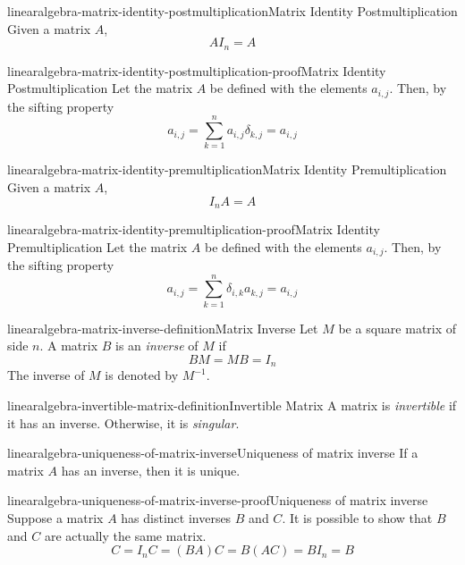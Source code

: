 \documentclass[preview]{standalone}
\begin{document}
\begin{snippetproposition}{linearalgebra-matrix-identity-postmultiplication}{Matrix Identity Postmultiplication}{
    Given a matrix \(A\),
    \[ AI_n=A \]
}
\end{snippetproposition}

\begin{snippetproof}{linearalgebra-matrix-identity-postmultiplication-proof}{Matrix Identity Postmultiplication}{
    Let the matrix \(A\) be defined with the
    elements \(a_{i,j}\).
    Then, by the sifting property %
    \[
        a_{i,j} = \sum_{k=1}^n
        a_{i,j}\delta_{k,j} = a_{i,j}
    \]
}
\end{snippetproof}

\begin{snippetproposition}{linearalgebra-matrix-identity-premultiplication}{Matrix Identity Premultiplication}{
    Given a matrix \(A\),
    \[ I_n A=A \]
}
\end{snippetproposition}

\begin{snippetproof}{linearalgebra-matrix-identity-premultiplication-proof}{Matrix Identity Premultiplication}{
    Let the matrix \(A\) be defined with the
    elements \(a_{i,j}\).
    Then, by the sifting property %
    \[
        a_{i,j} = \sum_{k=1}^n
        \delta_{i,k}a_{k,j} = a_{i,j}
    \]
}
\end{snippetproof}

\begin{snippetdefinition}{linearalgebra-matrix-inverse-definition}{Matrix Inverse}{
    Let \(M\) be a square matrix of side \(n\).
    A matrix \(B\) is an \textit{inverse}
    of \(M\) if \[BM=MB=I_n\]
    The inverse of \(M\) is denoted by \(M^{-1}\).
}
\end{snippetdefinition}

\begin{snippetdefinition}{linearalgebra-invertible-matrix-definition}{Invertible Matrix}{
    A matrix is \textit{invertible} if it has an inverse.
    Otherwise, it is \textit{singular}.
}
\end{snippetdefinition}

\begin{snippetproposition}{linearalgebra-uniqueness-of-matrix-inverse}{Uniqueness of matrix inverse}{
    If a matrix \(A\) has an inverse, then it is unique.
}
\end{snippetproposition}

\begin{snippetproof}{linearalgebra-uniqueness-of-matrix-inverse-proof}{Uniqueness of matrix inverse}{
    Suppose a matrix \(A\) has distinct inverses \(B\)
    and \(C\).
    It is possible to show that \(B\) and \(C\) are actually
    the same matrix.
    \[
        C=I_n C = (BA) C = B (AC) = BI_n = B
    \]
}
\end{snippetproof}
\end{document}
